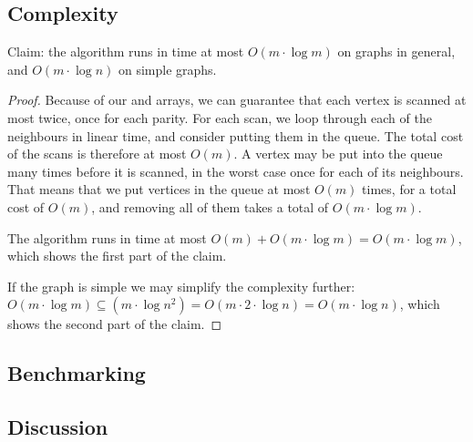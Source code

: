 \subsection{Complexity}
Claim: the algorithm runs in time at most $O(m \cdot \log m)$ on graphs in general, and $O(m \cdot \log n)$ on simple graphs.
\begin{proof}
    Because of our  and  arrays, we can guarantee that each vertex is scanned at most twice, once for each parity. For each scan, we loop through each of the neighbours in linear time, and consider putting them in the queue. The total cost of the scans is therefore at most $O(m)$. A vertex may be put into the queue many times before it is scanned, in the worst case once for each of its neighbours. That means that we put vertices in the queue at most $O(m)$ times, for a total cost of $O(m)$, and removing all of them takes a total of $O(m \cdot \log m)$. 
    
    The algorithm runs in time at most $O(m) + O(m \cdot \log m) = O(m \cdot \log m)$, which shows the first part of the claim.
    
    If the graph is simple we may simplify the complexity further: $O(m \cdot \log m) \subseteq (m \cdot \log n^2) = O(m \cdot 2 \cdot \log n) = O(m \cdot \log n)$, which shows the second part of the claim.
\end{proof}

\subsection{Benchmarking}

\subsection{Discussion}
